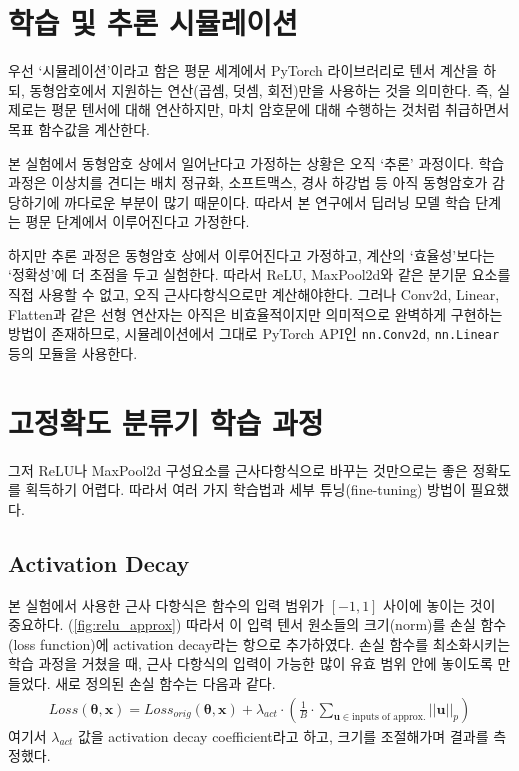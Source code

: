 \documentclass[a4paper, 11pt, chapterprefix=false]{report}
\renewcommand{\vec}{\mathbf}
\begin{document}
\section{학습 및 추론 시뮬레이션}

우선 `시뮬레이션'이라고 함은 평문 세계에서 PyTorch 라이브러리로 텐서 계산을
하되, 동형암호에서 지원하는 연산(곱셈, 덧셈, 회전)만을 사용하는 것을 의미한다.
즉, 실제로는 평문 텐서에 대해 연산하지만, 마치 암호문에 대해 수행하는 것처럼
취급하면서 목표 함수값을 계산한다.

본 실험에서 동형암호 상에서 일어난다고 가정하는 상황은 오직 `추론' 과정이다.
학습 과정은 이상치를 견디는 배치 정규화, 소프트맥스, 경사 하강법 등 아직
동형암호가 감당하기에 까다로운 부분이 많기 때문이다. 따라서 본 연구에서 딥러닝
모델 학습 단계는 평문 단계에서 이루어진다고 가정한다.

하지만 추론 과정은 동형암호 상에서 이루어진다고 가정하고, 계산의 `효율성'보다는
`정확성'에 더 초점을 두고 실험한다. 따라서 ReLU, MaxPool2d와 같은 분기문 요소를
직접 사용할 수 없고, 오직 근사다항식으로만 계산해야한다. 그러나 Conv2d, Linear,
Flatten과 같은 선형 연산자는 아직은 비효율적이지만 의미적으로 완벽하게 구현하는
방법이 존재하므로, 시뮬레이션에서 그대로 PyTorch API인 \texttt{nn.Conv2d},
\texttt{nn.Linear} 등의 모듈을 사용한다.

\section{고정확도 분류기 학습 과정}

그저 ReLU나 MaxPool2d 구성요소를 근사다항식으로 바꾸는 것만으로는 좋은 정확도를
획득하기 어렵다. 따라서 여러 가지 학습법과 세부 튜닝(fine-tuning) 방법이
필요했다.

\subsection{Activation Decay}

본 실험에서 사용한 근사 다항식은 함수의 입력 범위가 $[-1, 1]$ 사이에 놓이는 것이
중요하다. (\autoref{fig:relu_approx}) 따라서 이 입력 텐서 원소들의 크기(norm)를
손실 함수(loss function)에 activation decay라는 항으로 추가하였다. 손실 함수를
최소화시키는 학습 과정을 거쳤을 때, 근사 다항식의 입력이 가능한 많이 유효 범위
안에 놓이도록 만들었다. 새로 정의된 손실 함수는 다음과 같다.
\begin{align}
  Loss(\vec{\theta}, \vec{x}) = Loss_{orig}(\vec{\theta}, \vec{x})
    + \lambda_{act} \cdot \left( \frac{1}{B} \cdot \sum_{\vec u \in \text{inputs of approx.}} ||\vec u||_p \right)
  \label{eqn:act_decay}
\end{align}
여기서 $\lambda_{act}$ 값을 activation decay coefficient라고 하고, 크기를
조절해가며 결과를 측정했다.
\end{document}
